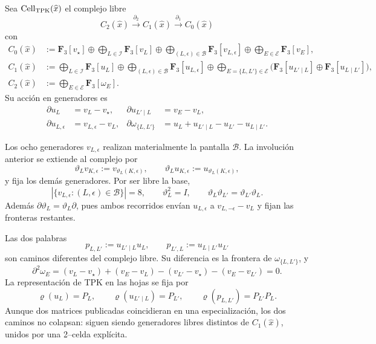 \begin{definition}
\label{def:pdfv2-cor-completacion-celular-tpk}
Sea \(\operatorname{Cell}_{\rm TPK}(\widehat x)\) el complejo libre
\[
 C_2(\widehat x)\xrightarrow{\partial_2}
 C_1(\widehat x)\xrightarrow{\partial_1}C_0(\widehat x)
\]
con
\begin{align*}
 C_0(\widehat x)
 &:=
 \mathbf F_3[v_\star]\oplus
 \bigoplus_{L\in\mathscr I}\mathbf F_3[v_L]\oplus
 \bigoplus_{(L,\epsilon)\in\mathscr B}
       \mathbf F_3[v_{L,\epsilon}]\oplus
 \bigoplus_{E\in\mathscr E}\mathbf F_3[v_E],\\
 C_1(\widehat x)
 &:=
 \bigoplus_{L\in\mathscr I}\mathbf F_3[u_L]\oplus
 \bigoplus_{(L,\epsilon)\in\mathscr B}
       \mathbf F_3[u_{L,\epsilon}]\oplus
 \bigoplus_{E=\{L,L'\}\in\mathscr E}
 \bigl(\mathbf F_3[u_{L'\mid L}]
       \oplus\mathbf F_3[u_{L\mid L'}]\bigr),\\
 C_2(\widehat x)
 &:=
 \bigoplus_{E\in\mathscr E}\mathbf F_3[\omega_E].
\end{align*}
Su acción en generadores es
\begin{align}
 \partial u_L&=v_L-v_\star,
 &
 \partial u_{L'\mid L}&=v_E-v_L,
 \label{eq:pdfv2-cor-cell-frontera-aristas}\\
 \partial u_{L,\epsilon}&=v_{L,\epsilon}-v_L,
 &
 \partial\omega_{\{L,L'\}}
 &=u_L+u_{L'\mid L}-u_{L'}-u_{L\mid L'}.
 \label{eq:pdfv2-cor-cell-frontera-celda}
\end{align}
\end{definition}

Los ocho generadores \(v_{L,\epsilon}\) realizan materialmente la pantalla
\(\mathscr B\). La involución anterior se extiende al complejo por
\begin{equation}
\label{eq:pdfv2-cor-pantalla-ocho-generadores}
 \vartheta_Lv_{K,\epsilon}:=v_{\vartheta_L(K,\epsilon)},\qquad
 \vartheta_Lu_{K,\epsilon}:=u_{\vartheta_L(K,\epsilon)},
\end{equation}
y fija los demás generadores. Por ser libre la base,
\begin{equation}
\label{eq:pdfv2-cor-pantalla-ocho-no-colapso}
 |\{v_{L,\epsilon}:(L,\epsilon)\in\mathscr B\}|=8,\qquad
 \vartheta_L^2=I,\qquad
 \vartheta_L\vartheta_{L'}=\vartheta_{L'}\vartheta_L.
\end{equation}
Además \(\partial\vartheta_L=\vartheta_L\partial\), pues ambos recorridos
envían \(u_{L,\epsilon}\) a \(v_{L,-\epsilon}-v_L\) y fijan las fronteras
restantes.

Las dos palabras
\[
 p_{L,L'}:=u_{L'\mid L}u_L,\qquad
 p_{L',L}:=u_{L\mid L'}u_{L'}
\]
son caminos diferentes del complejo libre. Su diferencia es la frontera de
\(\omega_{\{L,L'\}}\), y
\begin{equation}
\label{eq:pdfv2-cor-cell-dos-cero}
 \partial^2\omega_E
 =(v_L-v_\star)+(v_E-v_L)
 -(v_{L'}-v_\star)-(v_E-v_{L'})=0.
\end{equation}
La representación de TPK en las hojas se fija por
\[
 \varrho(u_L)=P_L,\qquad
 \varrho(u_{L'\mid L})=P_{L'},\qquad
 \varrho(p_{L,L'})=P_{L'}P_L.
\]
Aunque dos matrices publicadas coincidieran en una especialización, los dos
caminos no colapsan: siguen siendo generadores libres distintos de
\(C_1(\widehat x)\), unidos por una 2--celda explícita.

